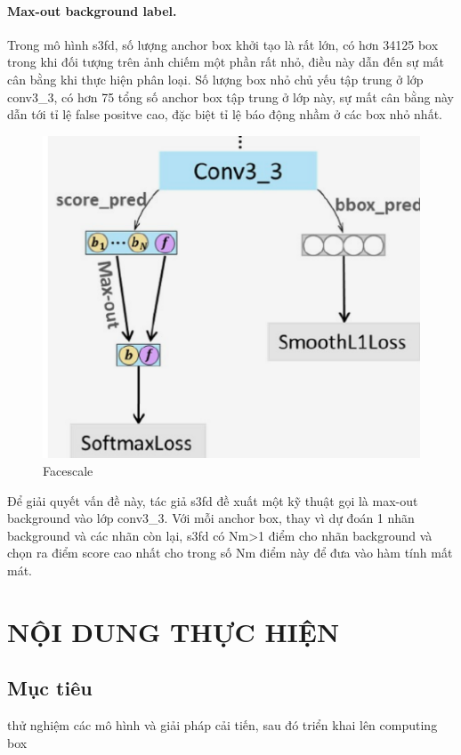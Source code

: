 \documentclass[a4paper]{report}
\begin{document}
\subsubsection{Max-out background label.}
Trong mô hình s3fd, số lượng anchor box khởi tạo là rất lớn, có hơn 34125 box trong khi đối tượng trên ảnh chiếm một phần rất nhỏ, điều này dẫn đến sự mất cân bằng khi thực hiện phân loại. Số lượng box nhỏ chủ yếu tập trung ở lớp conv3\_3, có hơn 75 tổng số anchor box tập trung ở lớp này, sự mất cân bằng này dẫn tới tỉ lệ false positve cao, đặc biệt tỉ lệ báo động nhầm ở các box nhỏ nhất. 
\\

\begin{figure}
	\includegraphics[scale=0.35]{3_maxout.png}
	\caption[Caption for LOF]{Facescale \footnotemark[0]} 
\end{figure}

Để giải quyết vấn đề này, tác giả s3fd đề xuất một kỹ thuật gọi là max-out background vào lớp conv3\_3. Với mỗi anchor box, thay vì dự đoán 1 nhãn background và các nhãn còn lại, s3fd có Nm>1 điểm cho nhãn background và chọn ra điểm score cao nhất cho trong số Nm điểm này để đưa vào hàm tính mất mát. 



\chapter{NỘI DUNG THỰC HIỆN}
\section{Mục tiêu} thử nghiệm các mô hình và giải pháp cải tiến, sau đó triển khai lên computing box
\end{document}
